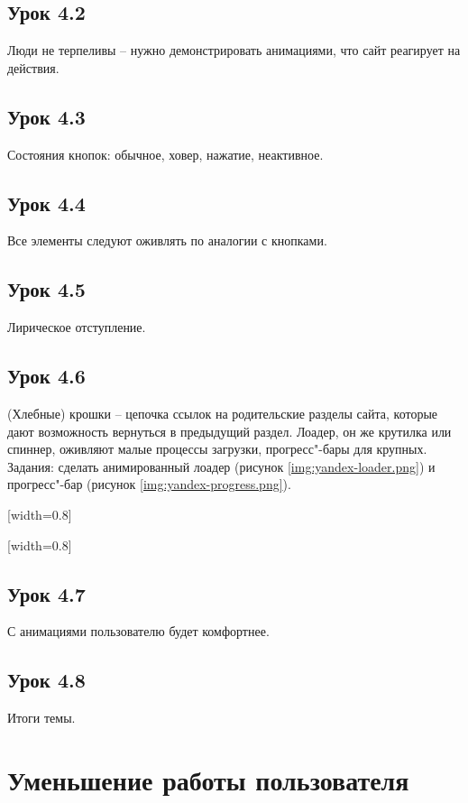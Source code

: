 \documentclass[variant=practice]{bsuir}
\begin{document}
\subsection{Урок 4.2} Люди не терпеливы -- нужно демонстрировать анимациями, что
сайт реагирует на действия.

\subsection{Урок 4.3} Состояния кнопок: обычное, ховер, нажатие, неактивное.

\subsection{Урок 4.4} Все элементы следуют оживлять по аналогии с кнопками.

\subsection{Урок 4.5} Лирическое отступление.

\subsection{Урок 4.6} (Хлебные) крошки -- цепочка ссылок на родительские разделы
сайта, которые дают возможность вернуться в предыдущий раздел. Лоадер, он же
крутилка или спиннер, оживляют малые процессы загрузки, прогресс"-бары для
крупных. Задания: сделать анимированный лоадер (рисунок
\ref{img:yandex-loader.png}) и прогресс"-бар (рисунок
\ref{img:yandex-progress.png}).

[width=0.8\textwidth]

[width=0.8\textwidth]

\subsection{Урок 4.7} С анимациями пользователю будет комфортнее.

\subsection{Урок 4.8} Итоги темы.

\section{Уменьшение работы пользователя}
\end{document}
